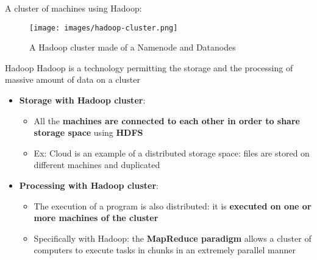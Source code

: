 \documentclass{beamer}[10pt, usepdftitle=false handout]
\begin{document}
	\begin{frame}
	A cluster of machines using Hadoop:	
	\vspace*{0.6em}
	
	\begin{figure}
	\texttt{[image: images/hadoop-cluster.png]} 
     	\vspace*{-0.5em}
		\caption{A Hadoop cluster made of a Namenode and Datanodes}
	\end{figure}	
			
	\begin{block}{Hadoop}
	Hadoop is a technology permitting the storage and the processing of massive amount of data on a cluster
	\end{block}	
		
	\end{frame}	
	
	\begin{frame}
	
	\begin{itemize}
	\item{\textbf{Storage with Hadoop cluster}: 
		\begin{itemize}
		\item{All the \textbf{machines are connected to each other in order to share storage space} using \textbf{HDFS}}
		\item{Ex: Cloud is an example of a distributed storage space: files are stored on different machines and duplicated}
		\end{itemize}
	}
		
	\item{\textbf{Processing with Hadoop cluster}:	
		\begin{itemize}
			\item{The execution of a program is also distributed: it is \textbf{executed on one or more machines of the cluster}}
			\item{Specifically with Hadoop: the \textbf{MapReduce paradigm} allows a cluster of computers to execute tasks in chunks in an extremely parallel manner}
		\end{itemize}
	}	
	
	\end{itemize}		
	
	\end{frame}
	
\end{document}
